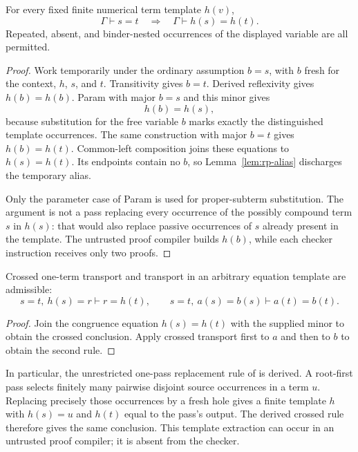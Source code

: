 \begin{theorem}
\label{thm:rp-congruence}
For every fixed finite numerical term template $h(v)$,
\[
 \Gamma\vdash s=t
 \quad\Longrightarrow\quad
 \Gamma\vdash h(s)=h(t).
\]
Repeated, absent, and binder-nested occurrences of the displayed variable
are all permitted.
\end{theorem}
\begin{proof}
Work temporarily under the ordinary assumption $b=s$, with $b$ fresh
for the context, $h$, $s$, and $t$.  Transitivity gives $b=t$.
Derived reflexivity gives $h(b)=h(b)$.  Param with major $b=s$ and
this minor gives
\[
 h(b)=h(s),
\]
because substitution for the free variable $b$ marks exactly the
distinguished template occurrences.  The same construction with major
$b=t$ gives $h(b)=h(t)$.  Common-left composition joins these equations
to $h(s)=h(t)$.  Its endpoints contain no $b$, so
Lemma~\ref{lem:rp-alias} discharges the temporary alias.

Only the parameter case of Param is used for proper-subterm substitution.
The argument is not a pass replacing every occurrence of the possibly
compound term $s$ in $h(s)$: that would also replace passive occurrences
of $s$ already present in the template.  The untrusted proof compiler
builds $h(b)$, while each checker instruction receives only two proofs.
\end{proof}

\begin{corollary}
Crossed one-term transport and transport in an arbitrary equation template
are admissible:
\[
 s=t,\ h(s)=r\vdash r=h(t),\qquad
 s=t,\ a(s)=b(s)\vdash a(t)=b(t).
\]
\end{corollary}
\begin{proof}
Join the congruence equation $h(s)=h(t)$ with the supplied minor to obtain
the crossed conclusion.  Apply crossed transport first to $a$ and then
to $b$ to obtain the second rule.
\end{proof}

In particular, the unrestricted one-pass replacement rule of
\cite{templatefree} is derived.  A root-first pass selects finitely many
pairwise disjoint source occurrences in a term $u$.  Replacing precisely
those occurrences by a fresh hole gives a finite template $h$ with
$h(s)=u$ and $h(t)$ equal to the pass's output.  The derived crossed
rule therefore gives the same conclusion.  This template extraction
can occur in an untrusted proof compiler; it is absent from the checker.

